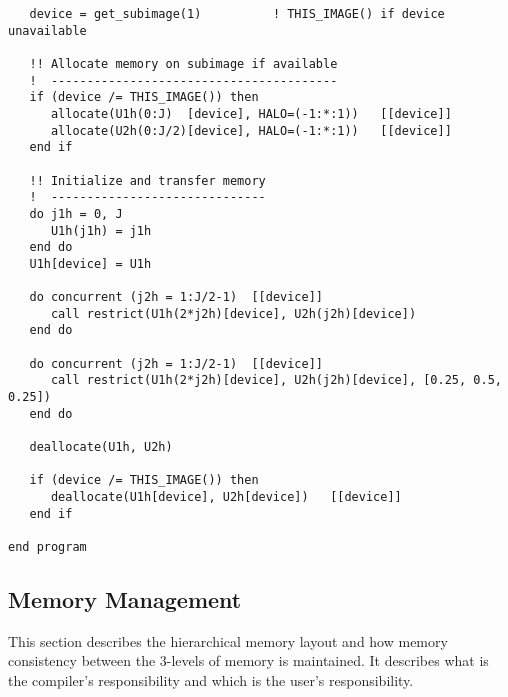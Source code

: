 \begin{verbatim}
   device = get_subimage(1)          ! THIS_IMAGE() if device unavailable

   !! Allocate memory on subimage if available
   !  ----------------------------------------
   if (device /= THIS_IMAGE()) then
      allocate(U1h(0:J)  [device], HALO=(-1:*:1))   [[device]]
      allocate(U2h(0:J/2)[device], HALO=(-1:*:1))   [[device]]
   end if

   !! Initialize and transfer memory
   !  ------------------------------
   do j1h = 0, J
      U1h(j1h) = j1h
   end do
   U1h[device] = U1h

   do concurrent (j2h = 1:J/2-1)  [[device]]
      call restrict(U1h(2*j2h)[device], U2h(j2h)[device])
   end do

   do concurrent (j2h = 1:J/2-1)  [[device]]
      call restrict(U1h(2*j2h)[device], U2h(j2h)[device], [0.25, 0.5, 0.25])
   end do

   deallocate(U1h, U2h)

   if (device /= THIS_IMAGE()) then
      deallocate(U1h[device], U2h[device])   [[device]]
   end if
         
end program
\end{verbatim}




\subsection{Memory Management}

This section describes the hierarchical memory layout and how memory consistency between the 3-levels of memory is maintained.  It describes what is the compiler's responsibility and which is the user's responsibility.


